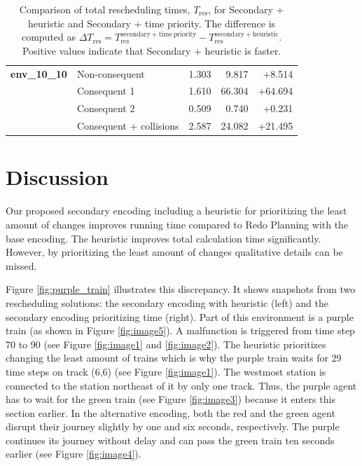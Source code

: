 \documentclass[runningheads]{llncs}
\begin{document}
\begin{table}[htbp]
\begin{tabular}{@{}llrrr@{}}
		\midrule
		
		\textbf{env\_10\_10}
		& Non-consequent & 1.303 & 9.817 & +8.514 \\
		& Consequent 1 & 1.610 & 66.304 & +64.694 \\
		& Consequent 2 & 0.509 & 0.740 & +0.231 \\
		& Consequent + collisions & 2.587 & 24.082 & +21.495 \\
		
		\bottomrule
	\end{tabular}
	\vspace{4mm}
	\caption{Comparison of total rescheduling times, $T_{\mathrm{res}}$, for
		Secondary + heuristic and Secondary + time priority. The difference is
		computed as
		$\Delta T_{\mathrm{res}} =
		T_{\mathrm{res}}^{\mathrm{secondary+time\ priority}} -
		T_{\mathrm{res}}^{\mathrm{secondary+heuristic}}$.
		Positive values indicate that Secondary + heuristic is faster.}
	\label{tab:rescheduling_time_priority}
\end{table}


\section{Discussion}

Our proposed secondary encoding including a heuristic for prioritizing the least amount of changes improves running time compared to Redo Planning with the base encoding. The heuristic improves total calculation time significantly. However, by prioritizing the least amount of changes qualitative details can be missed.

Figure \ref{fig:purple_train} illustrates this discrepancy. It shows snapshots from two rescheduling solutions: the secondary encoding with heuristic (left) and the secondary encoding prioritizing time (right). Part of this environment is a purple train (as shown in Figure \ref{fig:image5}). A malfunction is triggered from time step 70 to 90 (see Figure \ref{fig:image1} and \ref{fig:image2}). The heuristic prioritizes changing the least amount of trains which is why the purple train waits for 29 time steps on track (6,6) (see Figure \ref{fig:image1}). The westmost station is connected to the station northeast of it by only one track. Thus, the purple agent has to wait for the green train (see Figure \ref{fig:image3}) because it enters this section earlier.
In the alternative encoding, both the red and the green agent disrupt their journey slightly by one and six seconds, respectively. The purple continues its journey without delay and can pass the green train ten seconds earlier (see Figure \ref{fig:image4}).
\end{document}
